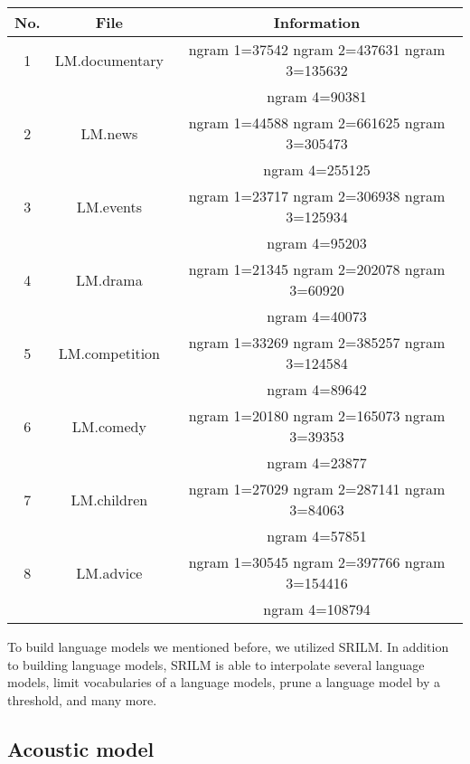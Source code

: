 \begin{enumerate}
\begin{center}
\begin{tabular}{ | c | c | c | }
\hline
\textbf{No.} & \textbf{File}  & \textbf{Information} \\ \hline \hline
1 & LM.documentary & ngram 1=37542
ngram 2=437631
ngram 3=135632 \\
& & ngram 4=90381   \\ \hline
2 & LM.news & ngram 1=44588
ngram 2=661625
ngram 3=305473 \\
& & ngram 4=255125  \\ \hline
3 & LM.events & ngram 1=23717
ngram 2=306938
ngram 3=125934 \\
& & ngram 4=95203  \\ \hline
4 & LM.drama & ngram 1=21345
ngram 2=202078
ngram 3=60920 \\
& & ngram 4=40073  \\ \hline
5 & LM.competition &  ngram 1=33269
ngram 2=385257
ngram 3=124584 \\
& & ngram 4=89642 \\ \hline
6 & LM.comedy & ngram 1=20180
ngram 2=165073
ngram 3=39353 \\
& & ngram 4=23877  \\ \hline
7 & LM.children &  ngram 1=27029
ngram 2=287141
ngram 3=84063 \\
& & ngram 4=57851 \\ \hline
8 & LM.advice & ngram 1=30545
ngram 2=397766
ngram 3=154416 \\
& & ngram 4=108794  \\ \hline
\end{tabular}
\end{center}

\end{enumerate}

To build language models we mentioned before, we utilized SRILM. In addition to building language models, SRILM is able to interpolate several language models, limit vocabularies of a language models, prune a language model by a threshold, and many more.


\subsection{Acoustic model}
